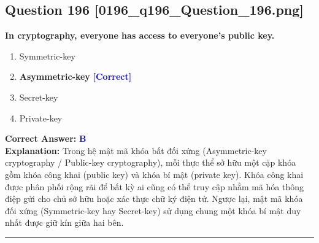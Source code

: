 \documentclass[11pt,a4paper]{article}
\begin{document}
\begin{minipage}{\textwidth}
\subsection*{Question 196 \quad \footnotesize{[0196\_q196\_Question\_196.png]}}
\noindent \textbf{In cryptography, everyone has access to everyone's public key.}

\begin{enumerate}[label=\Alph*.]
    \item Symmetric-key
    \item \textbf{Asymmetric-key} \hfill \textcolor{blue}{\textbf{[Correct]}}
    \item Secret-key
    \item Private-key
\end{enumerate}

\noindent \textbf{Correct Answer:} \textcolor{blue}{\textbf{B}} \\[2pt]
\noindent \textbf{Explanation:} Trong hệ mật mã khóa bất đối xứng (Asymmetric-key cryptography / Public-key cryptography), mỗi thực thể sở hữu một cặp khóa gồm khóa công khai (public key) và khóa bí mật (private key). Khóa công khai được phân phối rộng rãi để bất kỳ ai cũng có thể truy cập nhằm mã hóa thông điệp gửi cho chủ sở hữu hoặc xác thực chữ ký điện tử. Ngược lại, mật mã khóa đối xứng (Symmetric-key hay Secret-key) sử dụng chung một khóa bí mật duy nhất được giữ kín giữa hai bên.

\par\vspace{0.3cm}
\hrule
\vspace{0.3cm}
\end{minipage}
\end{document}
